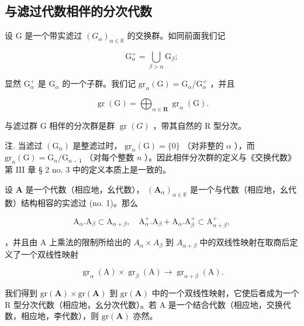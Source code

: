 \subsection{与滤过代数相伴的分次代数}

设 G 是一个带实滤过 \((G_{\alpha})_{\alpha \in \mathbb{R}}\) 的交换群。如同前面我们记

\[
\mathrm{G} _ {\alpha} ^ {+} = \bigcup_ {\beta > \alpha} \mathrm{G} _ {\beta};\tag{9}
\]

显然 \(\mathrm{G}_{\alpha}^{+}\) 是 \(\mathrm{G}_{\alpha}\) 的一个子群。我们记 \(\mathrm{gr}_{\alpha}(\mathrm{G}) = \mathrm{G}_{\alpha} / \mathrm{G}_{\alpha}^{+}\) ，并且

\[
\operatorname{gr} (\mathrm{G}) = \bigoplus_ {\alpha \in \mathbf {R}} \operatorname{gr} _ {\alpha} (\mathrm{G}).
\]

与滤过群 G 相伴的分次群是群 \(\operatorname{gr}(G)\) ，带其自然的 R 型分次。

注. 当滤过 \((\mathrm{G}_{\alpha})\) 是整滤过时， \(\mathrm{gr}_{\alpha}(\mathrm{G}) = \{0\}\) （对非整的 \(\alpha\) ），而 \(\mathrm{gr}_n(\mathrm{G}) = \mathrm{G}_n / \mathrm{G}_{n - 1}\) （对每个整数 \(n\) ）。因此相伴分次群的定义与《交换代数》第 III 章 § 2 no. 3 中的定义本质上是一致的。

设 \(\mathbf{A}\) 是一个代数（相应地，幺代数）， \((\mathbf{A}_{\alpha})_{\alpha \in \mathbb{R}}\) 是一个与代数（相应地，幺代数）结构相容的实滤过 (no. 1)。那么

\[
\mathrm{A} _ {\alpha}. \mathrm{A} _ {\beta} \subset \mathrm{A} _ {\alpha + \beta}, \quad \mathrm{A} _ {\alpha} ^ {+}. \mathrm{A} _ {\beta} + \mathrm{A} _ {\alpha}. \mathrm{A} _ {\beta} ^ {+} \subset \mathrm{A} _ {\alpha + \beta} ^ {+},
\]

，并且由 A 上乘法的限制所给出的 \(A_{\alpha} \times A_{\beta}\) 到 \(A_{\alpha+\beta}\) 中的双线性映射在取商后定义了一个双线性映射

\[
\operatorname{gr} _ {\alpha} (\mathrm{A}) \times \operatorname{gr} _ {\beta} (\mathrm{A}) \rightarrow \operatorname{gr} _ {\alpha + \beta} (\mathrm{A}).
\]

我们得到 \(\mathrm{gr}(\mathbf{A}) \times \mathrm{gr}(\mathbf{A})\) 到 \(\mathrm{gr}(\mathbf{A})\) 中的一个双线性映射，它使后者成为一个 R 型分次代数（相应地，幺分次代数）。若 A 是一个结合代数（相应地，交换代数，相应地，李代数），则 \(\mathrm{gr}(\mathbf{A})\) 亦然。

